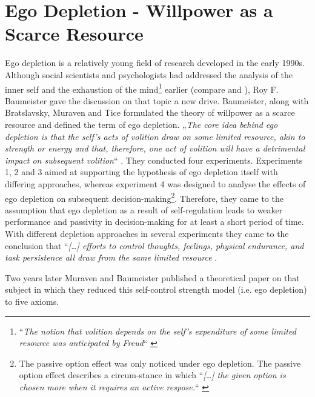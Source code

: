 \section{Ego Depletion - Willpower as a Scarce Resource}
Ego depletion is a relatively young field of research developed in the early 1990s. Although social scientists and psychologists had addressed the analysis of the inner self and the exhaustion of the mind\footnote{“\emph{The notion that volition depends on the self’s expenditure of some limited resource was anticipated by Freud}“ \citep{baumeister1998ego}} earlier (compare \citep{ross1975perceived} and \citep{brody1968personality}), Roy F. Baumeister \citep{baumeister1998ego} gave the discussion on that topic a new drive. Baumeister, along with Bratslavsky, Muraven and Tice formulated the theory of willpower as a scarce resource and defined the term of ego depletion. „\emph{The core idea behind ego depletion is that the self's acts of volition draw on some limited resource, akin to strength or energy and that, therefore, one act of volition will have a detrimental impact on subsequent volition}“ \citep{baumeister1998ego}. They conducted four experiments. Experiments 1, 2 and 3 aimed at supporting the hypothesis of ego depletion itself with differing approaches, whereas experiment 4 was designed to analyse the effects of ego depletion on subsequent decision-making\footnote{The passive option effect was only noticed under ego depletion. The passive option effect describes a circum-stance in which “\emph{[\ldots] the given option is chosen more when it requires an active respose.}“ \citep{baumeister1998ego}}. Therefore, they came to the assumption that ego depletion as a result of self-regulation leads to weaker performance and passivity in decision-making for at least a short period of time. With different depletion approaches in several experiments they came to the conclusion that “\emph{[\ldots] efforts to control thoughts, feelings, physical endurance, and task persistence all draw from the same limited resource} \citep{muraven1998self}.\par
Two years later Muraven and Baumeister \citep{muraven2000self} published a theoretical paper on that subject in which they reduced this self-control strength model (i.e. ego depletion) to five axioms.
